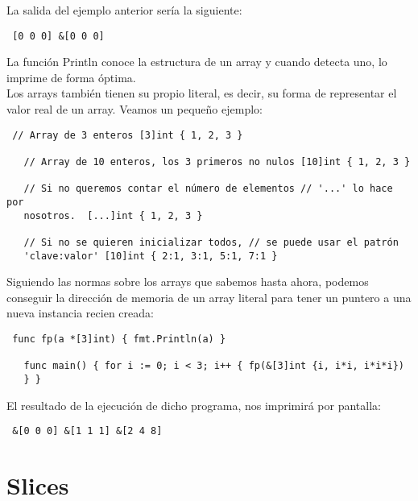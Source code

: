 La salida del ejemplo anterior sería la siguiente:

\begin{verbatim} [0 0 0] &[0 0 0] \end{verbatim}

La función Println conoce la estructura de un array y cuando detecta uno, lo
imprime de forma óptima.\\

Los arrays también tienen su propio literal, es decir, su forma de representar
el valor real de un array. Veamos un pequeño ejemplo:

\begin{verbatim} // Array de 3 enteros [3]int { 1, 2, 3 } 
   
   // Array de 10 enteros, los 3 primeros no nulos [10]int { 1, 2, 3 }
   
   // Si no queremos contar el número de elementos // '...' lo hace por
   nosotros.  [...]int { 1, 2, 3 }
   
   // Si no se quieren inicializar todos, // se puede usar el patrón
   'clave:valor' [10]int { 2:1, 3:1, 5:1, 7:1 } \end{verbatim}

Siguiendo las normas sobre los arrays que sabemos hasta ahora, podemos conseguir
la dirección de memoria de un array literal para tener un puntero a una nueva
instancia recien creada:

\begin{verbatim} func fp(a *[3]int) { fmt.Println(a) }
   
   func main() { for i := 0; i < 3; i++ { fp(&[3]int {i, i*i, i*i*i})
   } } \end{verbatim}

El resultado de la ejecución de dicho programa, nos imprimirá por pantalla:

\begin{verbatim} &[0 0 0] &[1 1 1] &[2 4 8] \end{verbatim}

\section{Slices}

